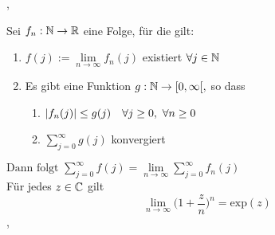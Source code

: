 \sep

\Satz[2.7.28] Sei $f_n : \mathbb{N} \rightarrow \mathbb{R}$ eine Folge, für die gilt:
\begin{enumerate}
\item[(1)] $ f(j) :=  \lim\limits_{n \rightarrow \infty} f_n(j) $ existiert $\forall j \in \mathbb{N}$ 
\item[(2)] Es gibt eine Funktion $g : \mathbb{N} \rightarrow [0, \infty[,$ so dass
\begin{enumerate}
\item[(2.1)] $\left\lvert f_n(j) \right\rvert \leq g(j) \quad \forall j \geq 0, \ \forall n \geq 0$
\item[(2.2)] $\sum_{j=0}^{\infty} g(j)$ konvergiert
\end{enumerate}
\end{enumerate}

\( \text{Dann folgt } \sum_{j=0}^{\infty} f(j) =  \lim\limits_{n \rightarrow \infty} \sum_{j=0}^{\infty} f_n(j) \)  \\

\Korollar[2.7.29] Für jedes $z \in \mathbb{C}$ gilt
\[\lim\limits_{n \rightarrow \infty} \bigg(1 + \frac{z}{n} \bigg)^n = \text{exp}(z) \]
\sep